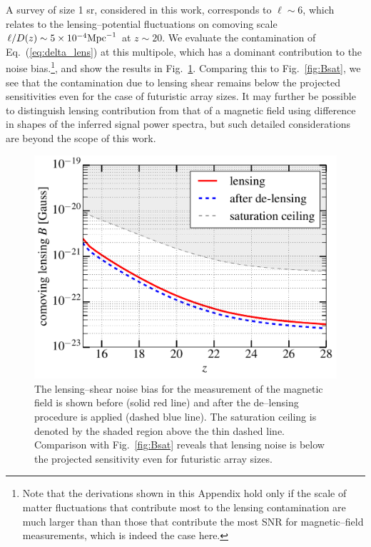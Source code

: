A survey of size 1 sr, considered in this work, corresponds to $\ell\sim 6$, which relates to the lensing--potential fluctuations on comoving scale $\ell/D(z)\sim 5\times 10^{-4}{\rm Mpc}^{-1}$ at $z\sim 20$. We evaluate the contamination of Eq.~(\ref{eq:delta_lens}) at this multipole, which has a dominant contribution to the noise bias.\footnote{Note that the derivations shown in this Appendix hold only if the scale of matter fluctuations that contribute most to the lensing contamination are much larger than than those that contribute the most SNR for magnetic--field measurements, which is indeed the case here.}, and show the results in Fig.~\ref{fig:lensing_B}. Comparing this to Fig.~\ref{fig:Bsat}, we see that the contamination due to lensing shear remains below the projected sensitivities even for the case of futuristic array sizes. It may further be possible to distinguish lensing contribution from that of a magnetic field using difference in shapes of the inferred signal power spectra, but such detailed considerations are beyond the scope of this work.
\begin{figure}[h]
\centering
\includegraphics[scale=0.4]{delensingB.pdf}
\caption{The lensing--shear noise bias for the measurement of the magnetic field is shown before (solid red line) and after the de--lensing procedure is applied (dashed blue line). The saturation ceiling is denoted by the shaded region above the thin dashed line. Comparison with Fig.~\ref{fig:Bsat} reveals that lensing noise is below the projected sensitivity even for futuristic array sizes.}
\label{fig:lensing_B}
\end{figure}
